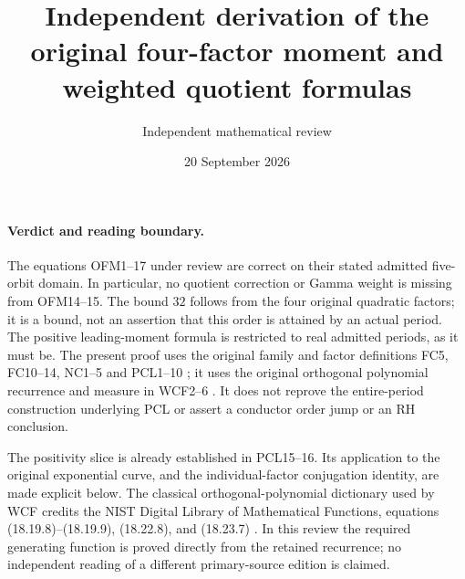 \documentclass[11pt]{article}
\title{Independent derivation of the original four-factor moment and weighted quotient formulas}
\author{Independent mathematical review}
\date{20 September 2026}
\begin{document}
\maketitle

\paragraph{Verdict and reading boundary.}
The equations OFM1--17 under review are correct on their stated admitted
five-orbit domain. In particular, no quotient correction or Gamma weight
is missing from OFM14--15. The bound $32$ follows from the four original
quadratic factors; it is a bound, not an assertion that this order is
attained by an actual period. The positive leading-moment formula is
restricted to real admitted periods, as it must be. The present proof
uses the original family and factor definitions FC5, FC10--14, NC1--5
and PCL1--10 \cite{FC,NC,PCL}; it uses the original orthogonal polynomial
recurrence and measure in WCF2--6 \cite{WCF}. It does not reprove the
entire-period construction underlying PCL or assert a conductor order
jump or an RH conclusion.

The positivity slice is already established in PCL15--16. Its application
to the original exponential curve, and the individual-factor conjugation
identity, are made explicit below. The classical orthogonal-polynomial
dictionary used by WCF credits the NIST Digital Library of Mathematical
Functions, equations (18.19.8)--(18.19.9), (18.22.8), and (18.23.7)
\cite{DLMF}. In this review the required generating function is proved
directly from the retained recurrence; no independent reading of a
different primary-source edition is claimed.
\end{document}
